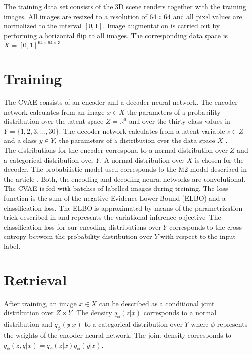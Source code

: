 The training data set consists of the 3D scene renders together with the training images. All images are resized to a resolution of $64\times64$ and all pixel values are normalized to the interval $[0,1]$. Image augmentation is carried out by performing a horizontal flip to all images. The corresponding data space is $X = [0,1]^{64\times 64 \times 3}$ . 

\section{Training}
The CVAE consists of an encoder and a decoder neural network. The encoder network calculates from an image $x\in X$ the parameters of a probability distribution over the latent space $Z = \mathbb{R}^d$ and over the thirty class values in $Y = \{1,2,3,\ldots, 30\}$. The decoder network calculates from a latent variable $z\in Z$ and a class $y\in Y$, the parameters of a distribution over the data space $X$ .\\

The distributions for the encoder correspond to a normal distribution over $Z$ and a categorical distribution over $Y$. A normal distribution over $X$ is chosen for the decoder. The probabilistic model used corresponds to the M2 model described in the article \cite{Kingma2014a}. Both, the encoding and decoding neural networks are convolutional.\\

The CVAE is fed with batches of labelled images during training. The loss function is the sum of the negative Evidence Lower Bound (ELBO) and a classification loss. The ELBO is approximated by means of the parametrization trick described in \cite{Kingma2014a, Kingma2014} and represents the variational inference objective. The classification loss for our encoding distributions over $Y$ corresponds to the cross entropy between the probability distribution over $Y$ with respect to the input label. 

\section{Retrieval}
After training, an image $x\in X$ can be described as a conditional joint distribution over $Z\times Y$. The density $q_\phi(z|x)$ corresponds to a normal distribution and $q_\phi(y|x)$ to a categorical distribution over $Y$ where $\phi$ represents the weights of the encoder neural network. The joint density corresponds to $q_\phi(z,y|x) = q_\phi(z|x) q_\phi(y|x)$.


